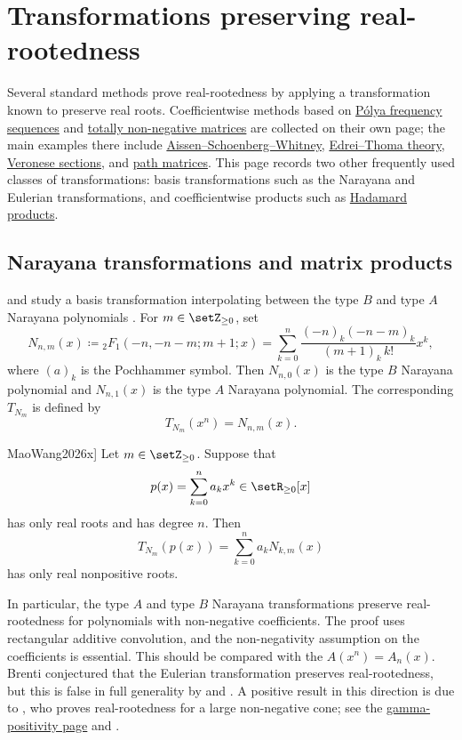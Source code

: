 \section[realRootedTransformations]{Transformations preserving real-rootedness}

Several standard methods prove real-rootedness by applying a transformation
known to preserve real roots.  Coefficientwise methods based on
\hyperref[polyaFrequency]{Pólya frequency sequences} and
\hyperref[totallyNonnegative]{totally non-negative matrices} are collected on
their own page; the main examples there include
\hyperref[aissenSchoenbergWhitney]{Aissen--Schoenberg--Whitney},
\hyperref[edreiThomaTheorem]{Edrei--Thoma theory},
\hyperref[veroneseSectionsPF]{Veronese sections}, and
\hyperref[tnnPathMatrix]{path matrices}.  This page records two other
frequently used classes of transformations: basis transformations such as the
Narayana and Eulerian transformations, and coefficientwise products such as
\hyperref[hadamardProduct]{Hadamard products}.


\subsection[narayanaTransformations]{Narayana transformations and matrix products}

 and  study a basis transformation
interpolating between the type $B$ and type $A$ Narayana polynomials
\cite{MaoWang2026x}.  For $m\in \setZ_{\geq 0}$, set
\[
  N_{n,m}(x)
  \coloneqq {}_2F_1(-n,-n-m;m+1;x)
  =
  \sum_{k=0}^n
  \frac{(-n)_k(-n-m)_k}{(m+1)_k\,k!}x^k,
\]
where $(a)_k$ is the Pochhammer symbol.  Then $N_{n,0}(x)$ is the
type $B$ Narayana polynomial and $N_{n,1}(x)$ is the type $A$
Narayana polynomial.  The corresponding
\label{narayanaTransformationDefinition}
$T_{N_m}$ is defined by
\[
  T_{N_m}(x^n)=N_{n,m}(x).
\]

\begin{theorem}[Mao--Wang, \cite[Thm.~1.1]{MaoWang2026x}]
\label{thm:narayanaTransformationMaoWang}
Let $m\in\setZ_{\geq 0}$.  Suppose that
\[
  p(x)=\sum_{k=0}^n a_kx^k \in \setR_{\geq 0}[x]
\]
has only real roots and has degree $n$.  Then
\[
  T_{N_m}(p(x))=\sum_{k=0}^n a_kN_{k,m}(x)
\]
has only real nonpositive roots.
\end{theorem}

In particular, the type $A$ and type $B$ Narayana transformations
preserve real-rootedness for polynomials with non-negative coefficients.
The proof uses rectangular additive convolution, and the non-negativity
assumption on the coefficients is essential.
This should be compared with the
\label{eulerianTransformation}
\(A(x^n)=A_n(x)\).  Brenti conjectured that the Eulerian transformation
preserves real-rootedness, but this is false in full generality by
 and 
\cite{BrandenJochemko2022}.  A positive result in this direction is due to
, who proves real-rootedness for a large
non-negative cone; see the \hyperref[gammaPositivity]{gamma-positivity page}
and \cite{Athanasiadis2025EulerianTransformation}.

